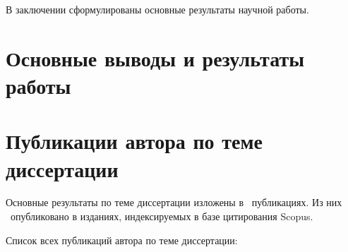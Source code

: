 В заключении сформулированы основные результаты научной работы.


\section*{Основные выводы и результаты работы}

\todo{}


\section*{Публикации автора по теме диссертации}

Основные результаты по теме диссертации изложены в \theAllMyPapers~публикациях.
Из них
\theScopusPapers~опубликовано в изданиях, индексируемых в базе цитирования Scopus.



Список всех публикаций автора по теме диссертации:
\begin{refsection}
\nocite{*}
\printbibliography[
    keyword=own,
    heading=none,
    resetnumbers=true
]
\end{refsection}
